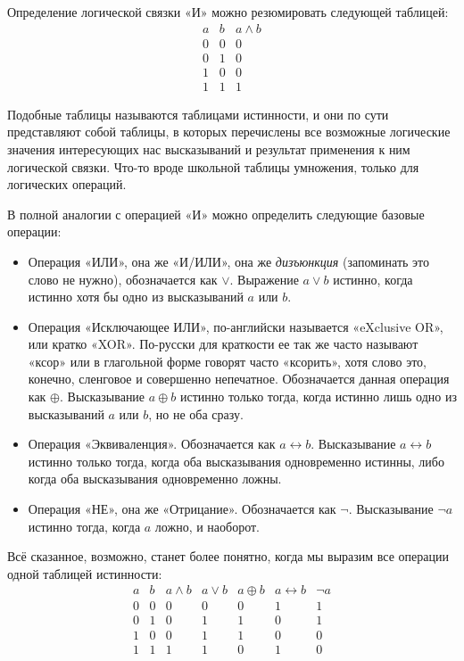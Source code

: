 Определение логической связки «И» можно резюмировать следующей таблицей:
$$
\begin{array}{cc|c}
a & b & a \wedge b \\
\hline
0 & 0 & 0 \\
0 & 1 & 0 \\
1 & 0 & 0 \\
1 & 1 & 1
\end{array}
$$

Подобные таблицы называются таблицами истинности, и они по сути представляют собой таблицы, в которых перечислены все возможные логические значения интересующих нас высказываний и результат применения к ним логической связки. Что-то вроде школьной таблицы умножения, только для логических операций.

В полной аналогии с операцией «И» можно определить следующие базовые операции:

\begin{itemize}
\item Операция «ИЛИ», она же «И/ИЛИ», она же \textit{дизъюнкция} (запоминать это слово не нужно), обозначается как $\vee$. Выражение $a\vee b$ истинно, когда истинно хотя бы одно из высказываний $a$ или $b$.
\item Операция «Исключающее ИЛИ», по-английски называется «eXclusive OR», или кратко «XOR». По-русски для краткости ее так же часто называют «ксор» или в глагольной форме говорят часто «ксорить», хотя слово это, конечно, сленговое и совершенно непечатное. Обозначается данная операция как $\oplus$. Высказывание $a \oplus b$ истинно только тогда, когда истинно лишь одно из высказываний $a$ или $b$, но не оба сразу.
\item Операция «Эквиваленция». Обозначается как $a \leftrightarrow b$. Высказывание $a \leftrightarrow b$ истинно только тогда, когда оба высказывания одновременно истинны, либо когда оба высказывания одновременно ложны.
\item Операция «НЕ», она же «Отрицание». Обозначается как $\neg$. Высказывание $\neg a$ истинно тогда, когда $a$ ложно, и наоборот.
\end{itemize}

Всё сказанное, возможно, станет более понятно, когда мы выразим все операции одной таблицей истинности:
$$
\begin{array}{cc|ccccc}
a & b & a\wedge b & a\vee b & a\oplus b & a\leftrightarrow b & \neg a\\
\hline
0 & 0 & 0 & 0 & 0 & 1 & 1 \\
0 & 1 & 0 & 1 & 1 & 0 & 1 \\
1 & 0 & 0 & 1 & 1 & 0 & 0 \\
1 & 1 & 1 & 1 & 0 & 1 & 0
\end{array}
$$

